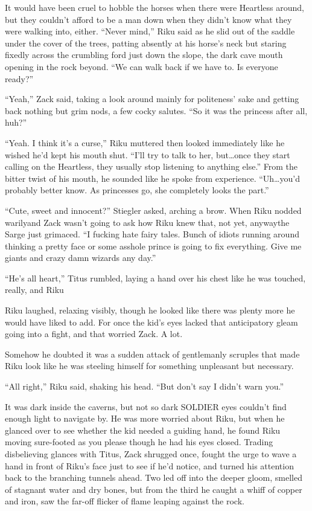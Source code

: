 It would have been cruel to hobble the horses when there were Heartless around, but they couldn't afford to be a man down when they didn't know what they were walking into, either. ``Never mind,'' Riku said as he slid out of the saddle under the cover of the trees, patting absently at his horse's neck but staring fixedly across the crumbling ford just down the slope, the dark cave mouth opening in the rock beyond. ``We can walk back if we have to. Is everyone ready?''

``Yeah,'' Zack said, taking a look around mainly for politeness' sake and getting back nothing but grim nods, a few cocky salutes. ``So it was the princess after all, huh?''

``Yeah. I think it's a curse,'' Riku muttered then looked immediately like he wished he'd kept his mouth shut. ``I'll try to talk to her, but\ldots once they start calling on the Heartless, they usually stop listening to anything else.'' From the bitter twist of his mouth, he sounded like he spoke from experience. ``Uh\ldots you'd probably better know. As princesses go, she completely looks the part.''

``Cute, sweet and innocent?'' Stiegler asked, arching a brow. When Riku nodded warily\textemdash and Zack wasn't going to ask how Riku knew that, not yet, anyway\textemdash the Sarge just grimaced. ``I fucking hate fairy tales. Bunch of idiots running around thinking a pretty face or some asshole prince is going to fix everything. Give me giants and crazy damn wizards any day.''

``He's all heart,'' Titus rumbled, laying a hand over his chest like he was touched, really, and Riku\textemdash 

Riku laughed, relaxing visibly, though he looked like there was plenty more he would have liked to add. For once the kid's eyes lacked that anticipatory gleam going into a fight, and that worried Zack. A lot.

Somehow he doubted it was a sudden attack of gentlemanly scruples that made Riku look like he was steeling himself for something unpleasant but necessary.

``All right,'' Riku said, shaking his head. ``But don't say I didn't warn you.''

It was dark inside the caverns, but not so dark SOLDIER eyes couldn't find enough light to navigate by. He was more worried about Riku, but when he glanced over to see whether the kid needed a guiding hand, he found Riku moving sure-footed as you please though he had his eyes closed. Trading disbelieving glances with Titus, Zack shrugged once, fought the urge to wave a hand in front of Riku's face just to see if he'd notice, and turned his attention back to the branching tunnels ahead. Two led off into the deeper gloom, smelled of stagnant water and dry bones, but from the third he caught a whiff of copper and iron, saw the far-off flicker of flame leaping against the rock.

